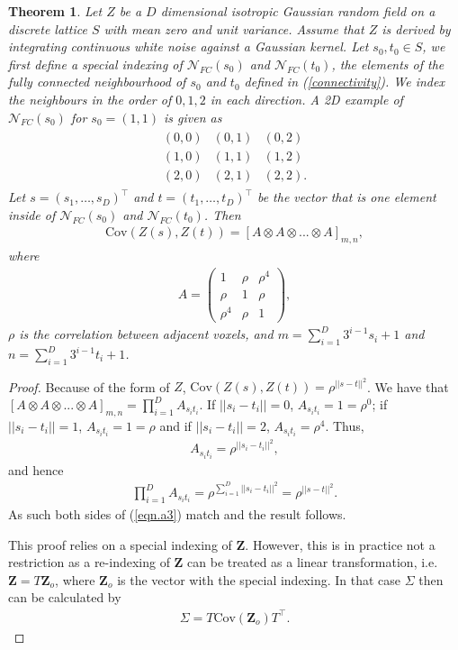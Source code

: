 \documentclass{article}
\newtheorem{theorem}{Theorem}
\newcommand{\Cov}{\mathrm{Cov}}
\begin{document}
\begin{theorem}\label{thm:thm}
	Let $Z$ be a $D$ dimensional isotropic Gaussian random field on a discrete lattice $S$ with mean zero and unit variance. Assume that $Z$ is derived by integrating continuous white noise against a Gaussian kernel. Let $s_0, t_0 \in S$, we first define a special indexing of $\mathcal{N}_{FC}(s_0)$ and $\mathcal{N}_{FC}(t_0)$, the elements of the fully connected neighbourhood of $s_0$ and $t_0$ defined in (\ref{connectivity}). We index the neighbours in the order of $0,1,2$ in each direction. A 2D example of $\mathcal{N}_{FC}(s_0)$ for $s_0 = (1,1)$ is given as 
	\begin{align*}
		\begin{matrix}
			(0,0) & (0,1) & (0,2)\\
			(1,0) & (1,1) & (1,2)\\
			(2,0) & (2,1) & (2,2).
		\end{matrix}
	\end{align*}
	Let $s = (s_1, \dots, s_D)^\top$ and $t = (t_1, \dots, t_D)^\top$ be the vector that is one element inside of $\mathcal{N}_{FC}(s_0)$ and $\mathcal{N}_{FC}(t_0)$. Then
	\begin{align}%
		\mathrm{Cov}(Z(s),Z(t)) = \left[A\otimes A \otimes... \otimes A\right]_{m,n},
	\end{align}
	where
	\begin{align*}
		A = \begin{pmatrix}
			1 & \rho & \rho^4\\
			\rho & 1 & \rho\\
			\rho^4 & \rho & 1
		\end{pmatrix},
	\end{align*}
	$\rho$ is the correlation between adjacent voxels, and $m = \sum_{i=1}^D 3^{i-1}s_{i}+1$ and $n = \sum_{i=1}^D 3^{i-1}t_{i}+1$.
\end{theorem}
\begin{proof} Because of the form of $Z$, $\Cov(Z(s), Z(t)) = \rho^{||s-t||^2}$. We have that $\left[A\otimes A \otimes... \otimes A\right]_{m,n} = \prod_{i=1}^D A_{s_it_i}$. If $||s_i-t_i|| = 0$, $A_{s_it_i} = 1 = \rho^0$; if $||s_i-t_i|| = 1$, $A_{s_it_i} = 1 = \rho$ and if $||s_i-t_i|| = 2$, $A_{s_it_i} = \rho^4$. Thus, 
\begin{align*}
    A_{s_it_i} = \rho^{||s_i-t_i||^2} ,
\end{align*}
and hence
\begin{align*}
\prod_{i=1}^D A_{s_it_i} = \rho^{\sum_{i=1}^D||s_i-t_i||^2} = \rho^{||s-t||^2}.
\end{align*}
As such both sides of (\ref{eqn.a3}) match and the result follows.

This proof relies on a special indexing of $\mathbf{Z}$. However, this is in practice not a restriction as a re-indexing of $\mathbf{Z}$ can be treated as a linear transformation, i.e. $\mathbf{Z} = T \mathbf{Z}_o$, where $\mathbf{Z}_o$ is the vector with the special indexing. In that case $\Sigma$ then can be calculated by
\begin{align*}
    \Sigma = T \mathrm{Cov}(\mathbf{Z}_o) T^\top.
\end{align*}
\end{proof}
\end{document}
